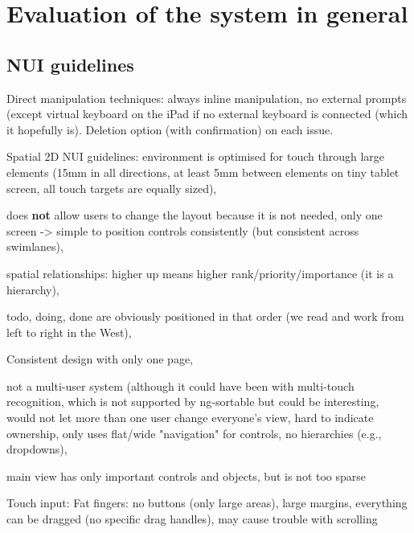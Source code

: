 \section{Evaluation of the system in general}

\subsection{NUI guidelines}

Direct manipulation techniques: always inline manipulation, no external prompts (except virtual keyboard on the iPad if no external keyboard is connected (which it hopefully is). Deletion option (with confirmation) on each issue.

Spatial 2D NUI guidelines: environment is optimised for touch through large elements (15mm in all directions, at least 5mm between elements on tiny tablet screen, all touch targets are equally sized),

does \textbf{not} allow users to change the layout because it is not needed, only one screen -> simple to position controls consistently (but consistent across swimlanes),

spatial relationships: higher up means higher rank/priority/importance (it is a hierarchy), %

todo, doing, done are obviously positioned in that order (we read and work from left to right in the West),

Consistent design with only one page,

not a multi-user system (although it could have been with multi-touch recognition, which is not supported by ng-sortable but could be interesting, would not let more than one user change everyone's view, hard to indicate ownership, only uses flat/wide "navigation" for controls, no hierarchies (e.g., dropdowns),

main view has only important controls and objects, but is not too sparse


Touch input: Fat fingers: no buttons (only large areas), large margins, everything can be dragged (no specific drag handles), may cause trouble with scrolling

